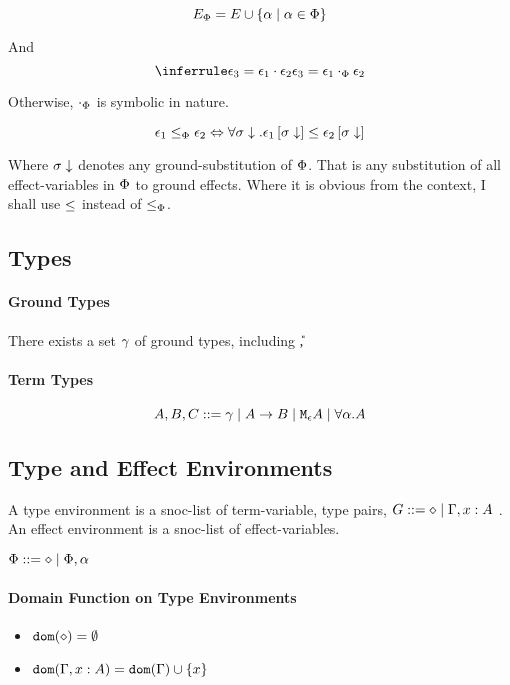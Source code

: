 {    \begin{equation}
        E_\P = E \cup \left\{\a \mid \a \in \P \right\}
    \end{equation}
    
    And 
    \begin{equation}
        \treeruleI{\e_3 = \e_1\dot\e_2}{\e_3 = \e_1\dotp\e_2}
    \end{equation}
    
    Otherwise, $\dotp$ is symbolic in nature.
    
    \begin{equation}
        \e_1 \subeffectp \e_2 \Leftrightarrow \forall \si\downarrow. \e_1\sub{\si\downarrow} \subeffect \e_2\sub{\si\downarrow}
    \end{equation}
    
    Where $\si\downarrow$ denotes any ground-substitution of $\P$. That is any substitution of all effect-variables in $\P$ to ground effects. Where it is obvious from the context, I shall use $\subeffect$ instead of $\subeffectp$.
    
    
    \subsection{Types}
        \paragraph{Ground Types}
            There exists a set $\ground$ of ground types, including \U, \B
        \paragraph{Term Types}
        $$ A, B, C \gens \ground \mid \ab \mid \mea \mid \all{\a}{A}$$
      
    \subsection{Type and Effect Environments}
    A type environment is a snoc-list of term-variable, type pairs, $G \gens \nil \mid \gax$ .
    An effect environment is a snoc-list of effect-variables.
    
    $\P\gens\nil\mid\P, \a$
    \paragraph{Domain Function on Type Environments}
    \begin{itemize}
        \item $\dom{\nil} = \emptyset$
        \item $\dom{\gax} =  \dom{\G}  \cup \left\{x \right\}$
    \end{itemize}
    
}
